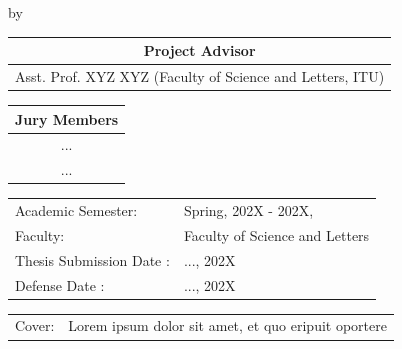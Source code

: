 \begin{titlepage}

\begin{center}

{\makeatletter
\largetitlestyle\fontsize{45}{45}\selectfont\@title
\makeatother}

{\makeatletter
\ifdefvoid{\@subtitle}{}{\bigskip\titlestyle\fontsize{20}{20}\selectfont\@subtitle}
\makeatother}

\bigskip
\bigskip

by

\bigskip
\bigskip

{\makeatletter
\largetitlestyle\fontsize{25}{25}\selectfont\@author
\makeatother}

\bigskip
\bigskip

\setlength\extrarowheight{2pt}

\vspace{3cm}

\begin{tabular}{c}
    Project Advisor \\\midrule
    Asst. Prof. XYZ XYZ (Faculty of Science and Letters, ITU) \\
\end{tabular}

\vspace{1cm}

\begin{tabular}{c}
    Jury Members \\\midrule
    ... \\
    ... \\
\end{tabular}

\vspace{4cm}

\begin{tabular}{ll}
    Academic Semester: & Spring, 202X - 202X, \\
    Faculty: & Faculty of Science and Letters\\
    Thesis Submission Date : & ..., 202X\\
    Defense Date : & ..., 202X\\
\end{tabular}

\vspace{1cm}

\begin{tabular}{p{15mm}p{10cm}}
    Cover: & Lorem ipsum dolor sit amet, et quo eripuit oportere\\
\end{tabular}


\end{center}
\end{titlepage}
